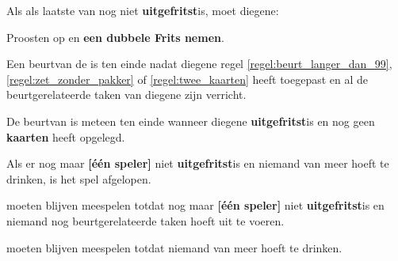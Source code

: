 \vervolgLijst{}
\item Als \eenSpeler als laatste van \alleSpelers nog niet \textbf{uitgefritst}\footnotemark[1] is, moet diegene:
\puntLijst{}
\item Proosten op  en \textbf{een dubbele Frits nemen}\footnotemark[3].
\eindPuntLijst{}
\eindLijst{}


\vervolgLijst{}
\item Een beurt\footnotemark[4] van de \huidigeSpeler is ten einde nadat diegene regel \ref{regel:beurt_langer_dan_99}, \ref{regel:zet_zonder_pakker} of \ref{regel:twee_kaarten} heeft toegepast en al de beurtgerelateerde taken van diegene zijn verricht.
\eindLijst{}

\vervolgLijst{}
\item De beurt\footnotemark[4] van \eenSpeler is meteen ten einde wanneer diegene \textbf{uitgefritst}\footnotemark[1] is en nog geen \textbf{kaarten} heeft opgelegd.
\eindLijst{}

\vervolgLijst{}
\item Als er nog maar \textbf{[\'e\'en speler]} niet \textbf{uitgefritst}\footnotemark[1] is en niemand van \alleSpelers meer hoeft te drinken, is het spel afgelopen.
\eindLijst{}

\vervolgLijst{}
\item \alleSpelers moeten blijven meespelen totdat nog maar \textbf{[\'e\'en speler]} niet \textbf{uitgefritst}\footnotemark[1] is en niemand nog beurtgerelateerde taken hoeft uit te voeren.
\eindLijst{}

\vervolgLijst{}
\item \alleSpelers moeten blijven meespelen totdat niemand van \alleSpelers meer hoeft te drinken.
\eindLijst{}

\footnotetext[3]{\footnoteEenDubbeleFritsNemen}

\newpage
{}
\label{hoofdstuk:jokers}

